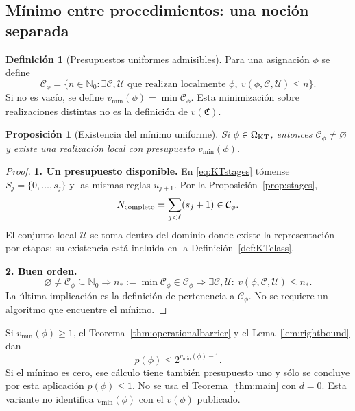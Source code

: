 \documentclass[11pt,a4paper]{article}
\numberwithin{equation}{section}
\newtheorem{proposition}[theorem]{Proposición}
\theoremstyle{definition}
\newtheorem{definition}[theorem]{Definición}
\theoremstyle{remark}
\newcommand{\Nn}{\mathbb N_0}
\newcommand{\paso}[1]{\par\smallskip\noindent\textbf{#1}\quad}
\begin{document}
\subsection{Mínimo entre procedimientos: una noción separada}
\begin{definition}[Presupuestos uniformes admisibles]\label{def:mincost}
Para una asignación $\phi$ se define
\[
\mathcal C_\phi=\{n\in\Nn:\exists\mathscr C,\mathcal U\text{ que realizan localmente }\phi,
\ v(\phi,\mathscr C,\mathcal U)\le n\}.
\]
Si no es vacío, se define $v_{\min}(\phi)=\min\mathcal C_\phi$. Esta minimización sobre realizaciones distintas no es la definición de $v(\mathfrak C)$.
\end{definition}

\begin{proposition}[Existencia del mínimo uniforme]\label{prop:minattained}
Si $\phi\in\Omega_{\rm KT}$, entonces $\mathcal C_\phi\ne\varnothing$ y existe una realización local con presupuesto $v_{\min}(\phi)$.
\end{proposition}
\begin{proof}
\paso{1. Un presupuesto disponible.}
En \eqref{eq:KTstages} tómense $S_j=\{0,\ldots,s_j\}$ y las mismas reglas $u_{j+1}$. Por la Proposición~\ref{prop:stages},
\[
N_{\rm completo}=\sum_{j<\ell}(s_j+1)\in\mathcal C_\phi.
\]
El conjunto local $\mathcal U$ se toma dentro del dominio donde existe la representación por etapas; su existencia está incluida en la Definición~\ref{def:KTclass}.
\paso{2. Buen orden.}
\[
\varnothing\ne\mathcal C_\phi\subseteq\Nn
\Longrightarrow n_*:=\min\mathcal C_\phi\in\mathcal C_\phi
\Longrightarrow\exists\mathscr C,\mathcal U:\ v(\phi,\mathscr C,\mathcal U)\le n_*.
\]
La última implicación es la definición de pertenencia a $\mathcal C_\phi$. No se requiere un algoritmo que encuentre el mínimo.
\end{proof}

Si $v_{\min}(\phi)\ge1$, el Teorema~\ref{thm:operationalbarrier} y el Lema~\ref{lem:rightbound} dan
\[
p(\phi)\le2^{v_{\min}(\phi)-1}.
\]
Si el mínimo es cero, ese cálculo tiene también presupuesto uno y sólo se concluye por esta aplicación $p(\phi)\le1$. No se usa el Teorema~\ref{thm:main} con $d=0$. Esta variante no identifica $v_{\min}(\phi)$ con el $v(\phi)$ publicado.
\end{document}
